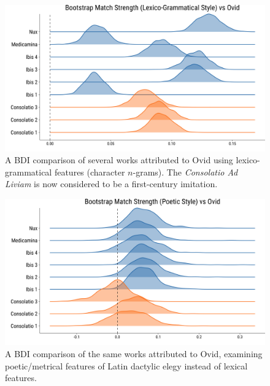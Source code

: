 \documentclass[
    hf
]{ceurart}
\begin{document}
\begin{figure}
    \includegraphics[width=\linewidth]{figures/bootstrap_lexical_paper.png}
    \caption{A BDI comparison of several works attributed to Ovid using
        lexico-grammatical features (character $n$-grams). The \emph{Consolatio Ad
            Liviam} is now considered to be a first-century imitation.}
    \label{fig:nux_lex}
\end{figure}

\begin{figure}
    \includegraphics[width=\linewidth]{figures/bootstrap_poetics_paper.png}
    \caption{A BDI comparison of the same works attributed to Ovid, examining
        poetic/metrical features of Latin dactylic elegy instead of lexical
        features.}
    \label{fig:nux_poet}
\end{figure}
\end{document}

